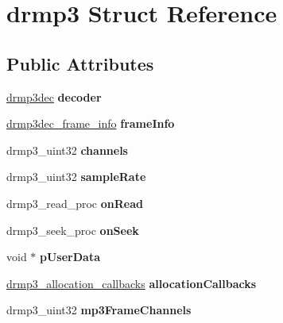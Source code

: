 \hypertarget{structdrmp3}{}\section{drmp3 Struct Reference}
\label{structdrmp3}
\subsection*{Public Attributes}
\begin{DoxyCompactItemize}
\item 
\mbox{\label{structdrmp3_aff4724123bbdf3b8e3071601c1f73ff7}} 
\mbox{\hyperlink{structdrmp3dec}{drmp3dec}} {\bfseries decoder}
\item 
\mbox{\label{structdrmp3_aa855f80f6dbc32827875ca95c8ea29bb}} 
\mbox{\hyperlink{structdrmp3dec__frame__info}{drmp3dec\+\_\+frame\+\_\+info}} {\bfseries frame\+Info}
\item 
\mbox{\label{structdrmp3_ade030203edf619566625bd278421d4e7}} 
drmp3\+\_\+uint32 {\bfseries channels}
\item 
\mbox{\label{structdrmp3_a125a69b581af18055b9aced80a68ddea}} 
drmp3\+\_\+uint32 {\bfseries sample\+Rate}
\item 
\mbox{\label{structdrmp3_aba375c193b3077addacb4ec3b7907752}} 
drmp3\+\_\+read\+\_\+proc {\bfseries on\+Read}
\item 
\mbox{\label{structdrmp3_ab40a369b3de3d2991076a566570a459b}} 
drmp3\+\_\+seek\+\_\+proc {\bfseries on\+Seek}
\item 
\mbox{\label{structdrmp3_addb6bdb74e7b37f350c167ae211541df}} 
void $\ast$ {\bfseries p\+User\+Data}
\item 
\mbox{\label{structdrmp3_abd13e25085798cc56e1666ba42957298}} 
\mbox{\hyperlink{structdrmp3__allocation__callbacks}{drmp3\+\_\+allocation\+\_\+callbacks}} {\bfseries allocation\+Callbacks}
\item 
\mbox{\label{structdrmp3_aec49fe9de2778f11bb2013957fc12029}} 
drmp3\+\_\+uint32 {\bfseries mp3\+Frame\+Channels}
\item 

\end{DoxyCompactItemize}
